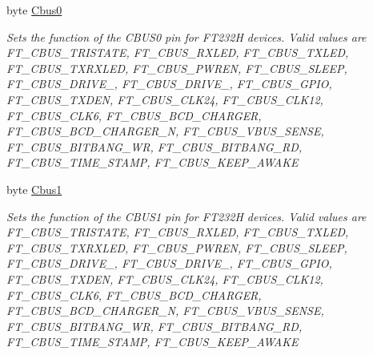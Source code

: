 \begin{DoxyCompactItemize}
byte \mbox{\hyperlink{class_f_t_d2_x_x___n_e_t_1_1_f_t_d_i_1_1_f_t___x_s_e_r_i_e_s___e_e_p_r_o_m___s_t_r_u_c_t_u_r_e_ab2e0eeb1e89bf72b8caeaf022ec89cde}{Cbus0}}
\begin{DoxyCompactList}\small\item\em Sets the function of the C\+B\+U\+S0 pin for F\+T232H devices. Valid values are F\+T\+\_\+\+C\+B\+U\+S\+\_\+\+T\+R\+I\+S\+T\+A\+TE, F\+T\+\_\+\+C\+B\+U\+S\+\_\+\+R\+X\+L\+ED, F\+T\+\_\+\+C\+B\+U\+S\+\_\+\+T\+X\+L\+ED, F\+T\+\_\+\+C\+B\+U\+S\+\_\+\+T\+X\+R\+X\+L\+ED, F\+T\+\_\+\+C\+B\+U\+S\+\_\+\+P\+W\+R\+EN, F\+T\+\_\+\+C\+B\+U\+S\+\_\+\+S\+L\+E\+EP, F\+T\+\_\+\+C\+B\+U\+S\+\_\+\+D\+R\+I\+V\+E\+\_, F\+T\+\_\+\+C\+B\+U\+S\+\_\+\+D\+R\+I\+V\+E\+\_, F\+T\+\_\+\+C\+B\+U\+S\+\_\+\+G\+P\+IO, F\+T\+\_\+\+C\+B\+U\+S\+\_\+\+T\+X\+D\+EN, F\+T\+\_\+\+C\+B\+U\+S\+\_\+\+C\+L\+K24, F\+T\+\_\+\+C\+B\+U\+S\+\_\+\+C\+L\+K12, F\+T\+\_\+\+C\+B\+U\+S\+\_\+\+C\+L\+K6, F\+T\+\_\+\+C\+B\+U\+S\+\_\+\+B\+C\+D\+\_\+\+C\+H\+A\+R\+G\+ER, F\+T\+\_\+\+C\+B\+U\+S\+\_\+\+B\+C\+D\+\_\+\+C\+H\+A\+R\+G\+E\+R\+\_\+N, F\+T\+\_\+\+C\+B\+U\+S\+\_\+\+V\+B\+U\+S\+\_\+\+S\+E\+N\+SE, F\+T\+\_\+\+C\+B\+U\+S\+\_\+\+B\+I\+T\+B\+A\+N\+G\+\_\+\+WR, F\+T\+\_\+\+C\+B\+U\+S\+\_\+\+B\+I\+T\+B\+A\+N\+G\+\_\+\+RD, F\+T\+\_\+\+C\+B\+U\+S\+\_\+\+T\+I\+M\+E\+\_\+\+S\+T\+A\+MP, F\+T\+\_\+\+C\+B\+U\+S\+\_\+\+K\+E\+E\+P\+\_\+\+A\+W\+A\+KE \end{DoxyCompactList}\item 
byte \mbox{\hyperlink{class_f_t_d2_x_x___n_e_t_1_1_f_t_d_i_1_1_f_t___x_s_e_r_i_e_s___e_e_p_r_o_m___s_t_r_u_c_t_u_r_e_af4948cbf7bfd05e26adbeb54f4338514}{Cbus1}}
\begin{DoxyCompactList}\small\item\em Sets the function of the C\+B\+U\+S1 pin for F\+T232H devices. Valid values are F\+T\+\_\+\+C\+B\+U\+S\+\_\+\+T\+R\+I\+S\+T\+A\+TE, F\+T\+\_\+\+C\+B\+U\+S\+\_\+\+R\+X\+L\+ED, F\+T\+\_\+\+C\+B\+U\+S\+\_\+\+T\+X\+L\+ED, F\+T\+\_\+\+C\+B\+U\+S\+\_\+\+T\+X\+R\+X\+L\+ED, F\+T\+\_\+\+C\+B\+U\+S\+\_\+\+P\+W\+R\+EN, F\+T\+\_\+\+C\+B\+U\+S\+\_\+\+S\+L\+E\+EP, F\+T\+\_\+\+C\+B\+U\+S\+\_\+\+D\+R\+I\+V\+E\+\_, F\+T\+\_\+\+C\+B\+U\+S\+\_\+\+D\+R\+I\+V\+E\+\_, F\+T\+\_\+\+C\+B\+U\+S\+\_\+\+G\+P\+IO, F\+T\+\_\+\+C\+B\+U\+S\+\_\+\+T\+X\+D\+EN, F\+T\+\_\+\+C\+B\+U\+S\+\_\+\+C\+L\+K24, F\+T\+\_\+\+C\+B\+U\+S\+\_\+\+C\+L\+K12, F\+T\+\_\+\+C\+B\+U\+S\+\_\+\+C\+L\+K6, F\+T\+\_\+\+C\+B\+U\+S\+\_\+\+B\+C\+D\+\_\+\+C\+H\+A\+R\+G\+ER, F\+T\+\_\+\+C\+B\+U\+S\+\_\+\+B\+C\+D\+\_\+\+C\+H\+A\+R\+G\+E\+R\+\_\+N, F\+T\+\_\+\+C\+B\+U\+S\+\_\+\+V\+B\+U\+S\+\_\+\+S\+E\+N\+SE, F\+T\+\_\+\+C\+B\+U\+S\+\_\+\+B\+I\+T\+B\+A\+N\+G\+\_\+\+WR, F\+T\+\_\+\+C\+B\+U\+S\+\_\+\+B\+I\+T\+B\+A\+N\+G\+\_\+\+RD, F\+T\+\_\+\+C\+B\+U\+S\+\_\+\+T\+I\+M\+E\+\_\+\+S\+T\+A\+MP, F\+T\+\_\+\+C\+B\+U\+S\+\_\+\+K\+E\+E\+P\+\_\+\+A\+W\+A\+KE \end{DoxyCompactList}\item 

\end{DoxyCompactItemize}
